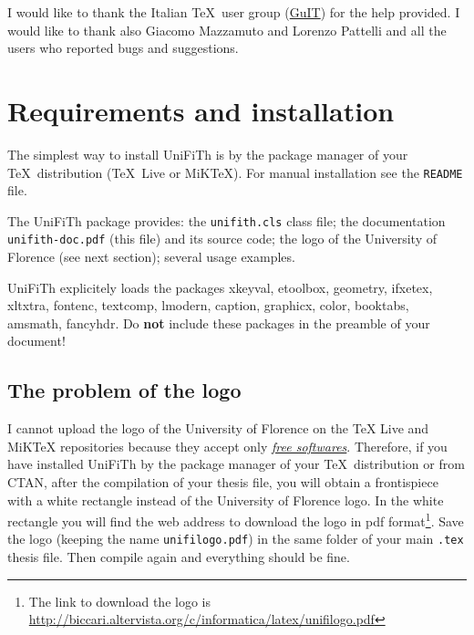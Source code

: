 \documentclass[a5paper,11pt]{article}
\begin{document}
I would like to thank the Italian \TeX\ user group (\href{http://www.guitex.org/}{GuIT}) for the help provided. I would like to thank also Giacomo Mazzamuto and Lorenzo Pattelli and all the users who reported bugs and suggestions.

\section[Requirements\\ and installation]{Requirements and installation}
\label{requirements_installation}

The simplest way to install \textsf{UniFiTh} is by the package manager of 
your \TeX\ distribution (\TeX\ Live or MiK\TeX). For manual installation see 
the \texttt{README} file. 

The \textsf{UniFiTh} package provides: the 
\texttt{unifith.cls} class file; the documentation 
\texttt{unifith-doc.pdf} (this file) and its source code; the logo of the 
University of Florence (see next section); several usage examples.


\textsf{UniFiTh} explicitely loads the packages \textsf{xkeyval}, \textsf{etoolbox}, \textsf{geometry}, \textsf{ifxetex}, \textsf{xltxtra}, \textsf{fontenc}, \textsf{textcomp}, \textsf{lmodern}, \textsf{caption}, \textsf{graphicx}, \textsf{color}, \textsf{booktabs}, \textsf{amsmath}, \textsf{fancyhdr}.
Do \textbf{not} include these packages in the preamble of your document!


\subsection[The problem of the logo]{The problem of the logo}
\label{logo_problem}

I cannot upload the logo of the University of Florence on the TeX Live and MiKTeX repositories because they accept only \href{https://en.wikipedia.org/wiki/Free_software}{\emph{free softwares}}. Therefore, if you have installed \textsf{UniFiTh} by the package manager of your \TeX\ distribution or from CTAN, after the compilation of your thesis file, you will obtain a frontispiece with a white rectangle instead of the University of Florence logo. In the white rectangle you will find the web address to download the logo in pdf format\footnote{The link to download the logo is \url{http://biccari.altervista.org/c/informatica/latex/unifilogo.pdf}}. Save the logo (keeping the name \texttt{unifilogo.pdf}) in the same folder of your main \texttt{.tex} thesis file. Then compile again and everything should be fine. 
\end{document}
